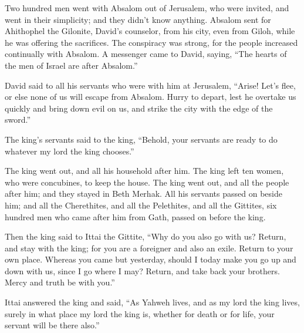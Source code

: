  Two hundred men went with Absalom out of Jerusalem, who
were invited, and went in their simplicity; and they didn't know
anything.  Absalom sent for Ahithophel the Gilonite,
David's counselor, from his city, even from Giloh, while he was offering
the sacrifices. The conspiracy was strong, for the people increased
continually with Absalom.  A messenger came to David,
saying, ``The hearts of the men of Israel are after Absalom.''

 David said to all his servants who were with him at
Jerusalem, ``Arise! Let's flee, or else none of us will escape from
Absalom. Hurry to depart, lest he overtake us quickly and bring down
evil on us, and strike the city with the edge of the sword.''

 The king's servants said to the king, ``Behold, your
servants are ready to do whatever my lord the king chooses.''

 The king went out, and all his household after him. The
king left ten women, who were concubines, to keep the house.
 The king went out, and all the people after him; and they
stayed in Beth Merhak.  All his servants passed on beside
him; and all the Cherethites, and all the Pelethites, and all the
Gittites, six hundred men who came after him from Gath, passed on before
the king.

 Then the king said to Ittai the Gittite, ``Why do you also
go with us? Return, and stay with the king; for you are a foreigner and
also an exile. Return to your own place.  Whereas you came
but yesterday, should I today make you go up and down with us, since I
go where I may? Return, and take back your brothers. Mercy and truth be
with you.''

 Ittai answered the king and said, ``As Yahweh lives, and
as my lord the king lives, surely in what place my lord the king is,
whether for death or for life, your servant will be there also.''

